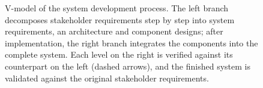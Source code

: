 \begin{figure}[H]
  \caption[V-model of the system development process]{%
    V-model of the system development process. The left branch decomposes
    stakeholder requirements step by step into system requirements, an
    architecture and component designs; after implementation, the right
    branch integrates the components into the complete system. Each
    level on the right is verified against its counterpart on the left
    (dashed arrows), and the finished system is validated against the
    original stakeholder requirements.}
  \label{fig:vmodel}
\end{figure}
